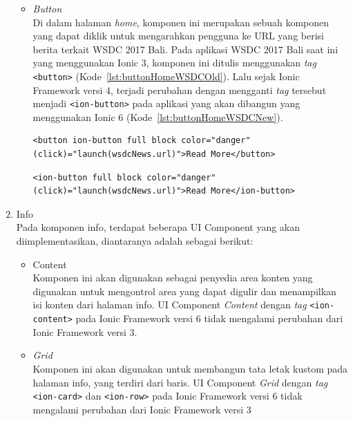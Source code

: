 \begin{enumerate}
\begin{itemize}
			\item \textit{Button} \\
			Di dalam halaman \textit{home}, komponen ini merupakan sebuah komponen yang dapat diklik untuk mengarahkan pengguna ke URL yang berisi berita terkait WSDC 2017 Bali. Pada aplikasi WSDC 2017 Bali saat ini yang menggunakan Ionic 3, komponen ini ditulis menggunakan \textit{tag} \texttt{<button>} (Kode~\ref{lst:buttonHomeWSDCOld}). Lalu sejak Ionic Framework versi 4, terjadi perubahan dengan mengganti \textit{tag} tersebut menjadi \texttt{<ion-button>} pada aplikasi yang akan dibangun yang menggunakan Ionic 6 (Kode~\ref{lst:buttonHomeWSDCNew}).
			\newpage
\begin{lstlisting}[label={lst:buttonHomeWSDCOld}, caption=\textit{Button} dengan Ionic 3 di Aplikasi WSDC 2017 Bali Saat Ini]
<button ion-button full block color="danger" (click)="launch(wsdcNews.url)">Read More</button>
\end{lstlisting}

\begin{lstlisting}[label={lst:buttonHomeWSDCNew}, caption=\textit{Button} dengan Ionic 6 di Aplikasi WSDC 2017 Bali yang Akan dibuat]
<ion-button full block color="danger" (click)="launch(wsdcNews.url)">Read More</ion-button>
\end{lstlisting}
			
		\end{itemize}
		
	\item Info \\
	Pada komponen info, terdapat beberapa UI Component yang akan diimplementasikan, diantaranya adalah sebagai berikut:
		\begin{itemize}
			\item Content \\
		Komponen ini akan digunakan sebagai penyedia area konten yang digunakan untuk mengontrol area yang dapat digulir dan menampilkan isi konten dari halaman info. UI Component \textit{Content} dengan \textit{tag} \texttt{<ion-content>} pada Ionic Framework versi 6 tidak mengalami perubahan dari Ionic Framework versi 3.
		
			\item \textit{Grid} \\
		Komponen ini akan digunakan untuk membangun tata letak kustom pada halaman info, yang terdiri dari baris. UI Component \textit{Grid} dengan \textit{tag} \texttt{<ion-card>} dan \texttt{<ion-row>} pada Ionic Framework versi 6 tidak mengalami perubahan dari Ionic Framework versi 3
		\end{itemize}
		

\end{enumerate}
